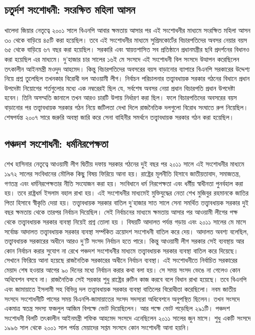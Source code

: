 \documentclass[11pt]{article}
\begin{document}
\subsection{চতুর্দশ সংশোধনী: সংরক্ষিত মহিলা আসন}
\label{sec:org954a8b0}
খালেদা জিয়ার নেতৃত্বে ২০০১ সালে বিএনপি আবার ক্ষমতায় আসার পর এই
সংশোধনীর মাধ্যমে সংরক্ষিত মহিলা আসন ৩০ থেকে বাড়িয়ে ৪৫টি করা
হয়েছিল। তবে এই সংশোধনীর মাধ্যমে সুপ্রিমকোর্টের বিচারপতিদের অবসর
নেয়ার বয়স ৬৫ থেকে বাড়িয়ে ৬৭ বছর করা হয়েছিল। সরকারি এবং
স্বায়ত্তশাসিত সব প্রতিষ্ঠানে প্রধানমন্ত্রীর ছবি প্রদর্শনের বিধানও করা
হয়েছিল এর মাধ্যমে। দু'হাজার চার সালের ১৬ই মে সংসদে এই সংশোধনী
বিল সংসদে উত্থাপন করেছিলেন তৎকালীন আইনমন্ত্রী মওদুদ আহমেদ। কিন্তু
বিচারপতিদের অবসরের বয়স বাড়ানোর ব্যাপারে বিএনপি সরকারের উদ্দেশ্য
নিয়ে প্রশ্ন তুলেছিল তখনকার বিরোধী দল আওয়ামী লীগ। নির্বাচন
পরিচালনার তত্ত্বাবধায়ক সরকার গঠনের বিধানে প্রধান উপদেষ্টা
নিয়োগের শর্তগুলোর মধ্যে এক নম্বরেরই ছিল যে, সর্বশেষ অবসর নেয়া
প্রধান বিচারপতি প্রধান উপদেষ্টা হবেন। তিনি অসম্মতি জানালে তখন
আরও চারটি উপায় নির্ধারণ করা ছিল। ফলে বিচারপতিদের অবসরের বয়স
বাড়ানোর পর তত্ত্বাবধায়ক সরকার গঠন নিয়ে জটিলতা দেখা দিলে
রাজনৈতিক দলগুলো বিরোধ সংঘাতে রুপ নিয়েছিল। শেষপর্যন্ত ২০০৭ সারে
জরুরি অবস্থা জারি করে সেনা বাহিনীর সমর্থনে তত্ত্বাবধায়ক সরকার গঠন
করা হয়েছিল।

\subsection{পঞ্চদশ সংশোধনী: ধর্মনিরপেক্ষতা}
\label{sec:orgdda33db}
শেখ হাসিনার নেতৃত্বে আওয়ামী লীগ দ্বিতীয় দফায় সরকার গঠনের দুই বছর
পর ২০১১ সালে এই সংশোধনীর মাধ্যমে ১৯৭২ সালের সংবিধানের মৌলিক
কিছু বিষয় ফিরিয়ে আনা হয়। রাষ্ট্রের মূলনীতি হিসাবে জাতীয়তাবাদ,
সমাজতন্ত্র, গণতন্ত্র এবং ধর্মনিরপেক্ষতার নীতি সংযোজন করা হয়।
সংবিধানে ধর্ম নিরপেক্ষতা এবং ধর্মীয় স্বাধীনতা পুনর্বহাল করা হয়।
তবে রাষ্ট্রধর্ম ইসলাম বহাল রাখা হয়। এই সংশোধনীর মাধ্যমেই
মুক্তিযুদ্ধের নেতা শেখ মুজিবুর রহমানকে জাতির পিতা হিসাবে স্বীকৃতি
দেয়া হয়। তত্ত্বাবধায়ক সরকার বাতিল দু'হাজার সাত সালে সেনা সমর্থিত
তত্ত্বাবধায়ক সরকার দুই বছর ক্ষমতায় থেকে তারপর নির্বাচন দিয়েছিল।
সেই নির্বাচনের মাধ্যমে ক্ষমতায় আসার পর আওয়ামী লীগের পক্ষ থেকে
তত্ত্বাবধায়ক সরকার ব্যবস্থা নিয়েই প্রশ্ন তোলা হয় । বিষয়টি আদালত
পর্যন্ত গড়ায় এবং ২০১১ সালের মে মাসে সর্বোচ্চ আদালত তত্ত্বাবধায়ক
সরকার ব্যবস্থা সর্ম্পকিত ত্রয়োদশ সংশোধনী বাতিল করে দেয়। আদালত
অবশ্য বলেছিল, তত্ত্বাবধায়ক সরকারের অধীনে আরও দু'টি সংসদ নির্বাচন
হতে পারে। কিন্তু আওয়ামী লীগ সরকার সেই ব্যবস্থায় আর কোন নির্বাচন
করার সুযোগ না রেখে পঞ্চদশ সংশোধনীর মাধ্যমে তত্ত্বাবধায়ক সরকার
ব্যবস্থা বাতিল করে দিয়েছে। সেখানে ফিরিয়ে আনা হয়েছে রাজনৈতিক
সরকারের অধীনে নির্বাচন ব্যবস্থা। এই সংশোধনীতে নির্বাচিত সরকারের
মেয়াদ শেষ হওয়ার আগের ৯০ দিনের মধ্যে নির্বাচন করার কথা বলা হয়।
সে সময় সংসদ ভেঙে না গেলেও কোন অধিবেশন বসবে না। রাজনৈতিক সেই
সরকার শুধু রাষ্ট্রের রুটিন কাজ করবে বলে বিধান রাখা হয়েছে। তবে
বিএনপি এবং জামায়াতে ইসলামী সহ বিভিন্ন দল তত্ত্বাবধায়ক সরকার
ব্যবস্থা বাতিলের বিরোধীতা করেছিলো। নবম জাতীয় সংসদে সংশোধনীটি
পাসের সময় বিএনপি-জামায়াতের সংসদ সদস্যরা অধিবেশনে অনুপস্থিত
ছিলেন। তখন সংসদে একমাত্র স্বতন্ত্র সদস্য ফজলুল আজিম বিপক্ষে ভোট
দিয়েছিলেন। আর পক্ষে ভোট পড়েছিল ২৯১টি। পঞ্চদশ সংশোধনী বিলটি
তৎকালীন আইনমন্ত্রী শফিক আহমেদ সংসদে এনেছিলেন ২০১১ সালের জুন
মাসে। শুধু একটি সংসদে ১৯৯৬ সাল থেকে ২০০১ সাল পর্যন্ত মেয়াদের
সপ্তম সংসদে কোন সংশোধনী আনা হয়নি।
\end{document}
